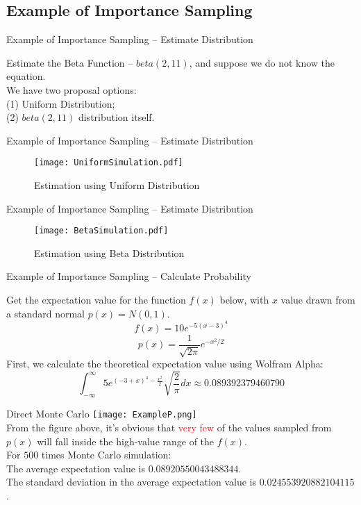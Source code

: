 \subsection{Example of Importance Sampling}

\begin{frame}{Example of Importance Sampling -- Estimate Distribution}

Estimate the Beta Function -- $beta(2, 11)$, and suppose we do not know the equation. \\
We have two proposal options:\\
(1) Uniform Distribution;\\
(2) $beta(2,11)$ distribution itself.

\end{frame}

\begin{frame}{Example of Importance Sampling -- Estimate Distribution}
\begin{figure}[ht]
		  \centering
          \texttt{[image: UniformSimulation.pdf]}
           \caption{Estimation using Uniform Distribution}
 \end{figure}
\end{frame}

\begin{frame}{Example of Importance Sampling -- Estimate Distribution}
\begin{figure}[ht]
		  \centering
          \texttt{[image: BetaSimulation.pdf]}
           \caption{Estimation using Beta Distribution}
 \end{figure}
\end{frame}

\begin{frame}{Example of Importance Sampling -- Calculate Probability}
\begin{example}
Get the expectation value for the function $f(x)$ below, with $x$ value drawn from a standard normal $p(x)=N(0,1)$. \\
\[f(x)=10 e^{-5(x-3)^{4}}\]
\[p(x)=\frac{1}{\sqrt{2 \pi}} e^{-x^{2} / 2}\]First, we calculate the theoretical expectation value using Wolfram Alpha:\\
\[\int_{-\infty}^{\infty} 5 e^{(-3+x)^{4}-\frac{x^{2}}{2}} \sqrt{\frac{2}{\pi}} d x \approx 0.089392379460790\]
\end{example}
\end{frame}

\begin{frame}{Direct Monte Carlo}
\texttt{[image: ExampleP.png]}\\
From the figure above, it's obvious that \textcolor{red}{very few} of the values sampled from $p(x)$ will fall inside the high-value range of the $f(x)$.\\
For $500$ times Monte Carlo simulation:\\
The average expectation value is $0.08920550043488344$.\\
The standard deviation in the average expectation value is $0.024553920882104115$.
\end{frame}

